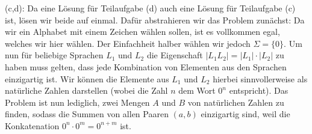 \documentclass[a4paper]{article}
\begin{document}
	(c,d): Da eine Lösung für Teilaufgabe (d) auch eine Lösung für Teilaufgabe (c) ist, lösen wir beide auf einmal.
	Dafür abstrahieren wir das Problem zunächst: Da wir ein Alphabet mit einem Zeichen wählen sollen, ist es vollkommen
	egal, welches wir hier wählen. Der Einfachheit halber wählen wir jedoch $\Sigma = \big\{ 0 \big\}$.
	Um nun für beliebige Sprachen $L_{1}$ und $L_{2}$ die Eigenschaft $\lvert L_{1}L_{2} \rvert = \lvert L_{1} \rvert \cdot \lvert L_{2} \rvert$
	zu haben muss gelten, dass jede Kombination von Elementen aus den Sprachen einzigartig ist.
	Wir können die Elemente aus $L_{1}$ und $L_{2}$ hierbei sinnvollerweise als natürliche Zahlen darstellen (wobei die Zahl $n$ dem Wort $0^n$ entspricht).
	Das Problem ist nun lediglich, zwei Mengen $A$ und $B$ von natürlichen Zahlen zu finden, sodass die Summen von allen Paaren $(a,b)$ einzigartig sind,
	weil die Konkatenation $0^n \cdot 0^m = 0^{n+m}$ ist.
\end{document}
